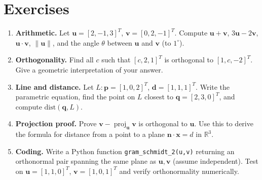 \section{Exercises}
\label{sec:ch01-exercises}
\begin{enumerate}[label=E1.\arabic*, leftmargin=*, itemsep=0.8em]
\item \textbf{Arithmetic.} Let $\mathbf{u}=[2,-1,3]^T$, $\mathbf{v}=[0,2,-1]^T$. Compute $\mathbf{u}+\mathbf{v}$, $3\mathbf{u}-2\mathbf{v}$, $\mathbf{u}\cdot\mathbf{v}$, $\|\mathbf{u}\|$, and the angle $\theta$ between $\mathbf{u}$ and $\mathbf{v}$ (to $1^\circ$).
\item \textbf{Orthogonality.} Find all $c$ such that $[c,2,1]^T$ is orthogonal to $[1,c,-2]^T$. Give a geometric interpretation of your answer.
\item \textbf{Line and distance.} Let $L:\mathbf{p}=[1,0,2]^T$, $\mathbf{d}=[1,1,1]^T$. Write the parametric equation, find the point on $L$ closest to $\mathbf{q}=[2,3,0]^T$, and compute $\text{dist}(\mathbf{q},L)$.
\item \textbf{Projection proof.} Prove $\mathbf{v}-\operatorname{proj}_{\mathbf{u}}\mathbf{v}$ is orthogonal to $\mathbf{u}$. Use this to derive the formula for distance from a point to a plane $\mathbf{n}\cdot\mathbf{x}=d$ in $\mathbb{R}^3$.
\item \textbf{Coding.} Write a Python function \texttt{gram\_schmidt\_2(u,v)} returning an orthonormal pair spanning the same plane as $\mathbf{u},\mathbf{v}$ (assume independent). Test on $\mathbf{u}=[1,1,0]^T$, $\mathbf{v}=[1,0,1]^T$ and verify orthonormality numerically.
\end{enumerate}
